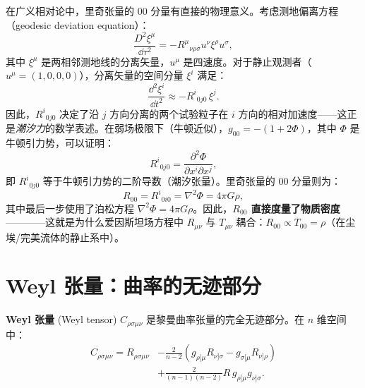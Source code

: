 \begin{note}
在广义相对论中，里奇张量的 $00$ 分量有直接的物理意义。考虑测地偏离方程（geodesic deviation equation）：
\begin{equation}
    \frac{D^2 \xi^\mu}{\dd\tau^2} = -R^\mu{}_{\nu\rho\sigma} u^\nu \xi^\rho u^\sigma,
\end{equation}
其中 $\xi^\mu$ 是两相邻测地线的分离矢量，$u^\mu$ 是四速度。对于静止观测者（$u^\mu = (1, 0, 0, 0)$），分离矢量的空间分量 $\xi^i$ 满足：
\begin{equation}
    \frac{\dd^2 \xi^i}{\dd t^2} \approx -R^i{}_{0j0}\, \xi^j.
\end{equation}
因此，$R^i{}_{0j0}$ 决定了沿 $j$ 方向分离的两个试验粒子在 $i$ 方向的相对加速度——这正是\emph{潮汐力}的数学表述。在弱场极限下（牛顿近似），$g_{00} = -(1 + 2\Phi)$，其中 $\Phi$ 是牛顿引力势，可以证明：
\begin{equation}
    R^i{}_{0j0} = \frac{\partial^2 \Phi}{\partial x^i \partial x^j},
\end{equation}
即 $R^i{}_{0j0}$ 等于牛顿引力势的二阶导数（潮汐张量）。里奇张量的 $00$ 分量则为：
\begin{equation}
    R_{00} = R^i{}_{0i0} = \nabla^2 \Phi = 4\pi G \rho,
\end{equation}
其中最后一步使用了泊松方程 $\nabla^2 \Phi = 4\pi G \rho$。因此，\textbf{$R_{00}$ 直接度量了物质密度}————这就是为什么爱因斯坦场方程中 $R_{\mu\nu}$ 与 $T_{\mu\nu}$ 耦合：$R_{00} \propto T_{00} = \rho$（在尘埃/完美流体的静止系中）。
\end{note}

\section{Weyl 张量：曲率的无迹部分}

\begin{definition}[Weyl 张量]
\textbf{Weyl 张量} (Weyl tensor) $C_{\rho\sigma\mu\nu}$ 是黎曼曲率张量的完全无迹部分。在 $n$ 维空间中：
\begin{equation}
    \begin{aligned}
    C_{\rho\sigma\mu\nu} = R_{\rho\sigma\mu\nu} &- \frac{2}{n-2} \left( g_{\rho[\mu} R_{\nu]\sigma} - g_{\sigma[\mu} R_{\nu]\rho} \right) \\
    &+ \frac{2}{(n-1)(n-2)} R \, g_{\rho[\mu} g_{\nu]\sigma}.
    \end{aligned}
\end{equation}
\end{definition}

